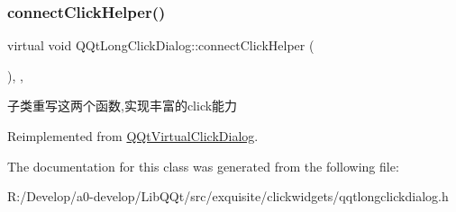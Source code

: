 \subsubsection{\texorpdfstring{connect\+Click\+Helper()}{connectClickHelper()}}
{\footnotesize\ttfamily virtual void Q\+Qt\+Long\+Click\+Dialog\+::connect\+Click\+Helper (\begin{DoxyParamCaption}{ }\end{DoxyParamCaption})\hspace{0.3cm}{\ttfamily [inline]}, {\ttfamily [protected]}, {\ttfamily [virtual]}}

子类重写这两个函数,实现丰富的click能力 

Reimplemented from \mbox{\hyperlink{class_q_qt_virtual_click_dialog_a93e958d50ddc3fb38ca0e4905673cf74}{Q\+Qt\+Virtual\+Click\+Dialog}}.



The documentation for this class was generated from the following file\+:\begin{DoxyCompactItemize}
\item 
R\+:/\+Develop/a0-\/develop/\+Lib\+Q\+Qt/src/exquisite/clickwidgets/qqtlongclickdialog.\+h\end{DoxyCompactItemize}
